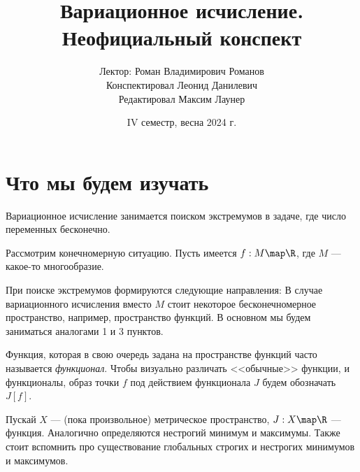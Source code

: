 \documentclass[a4paper]{article}
\date{IV семестр, весна 2024 г.}
\title{Вариационное исчисление. Неофициальный конспект}
\author{Лектор: Роман Владимирович Романов \\ Конспектировал Леонид Данилевич \\ Редактировал Максим Лаунер}
\begin{document}
    \maketitle
    \tableofcontents
    \newpage
    \setcounter{lection}{0}
    \section{Что мы будем изучать}
    Вариационное исчисление занимается поиском экстремумов в задаче, где число переменных бесконечно.

    Рассмотрим конечномерную ситуацию.
    Пусть имеется $f: M \map \R$, где $M$ --- какое-то многообразие.

    При поиске экстремумов формируются следующие направления:
    В случае вариационного исчисления вместо $M$ стоит некоторое бесконечномерное пространство, например, пространство функций.
    В основном мы будем заниматься аналогами 1 и 3 пунктов.

    Функция, которая в свою очередь задана на пространстве функций часто называется \emph{функционал}.
    Чтобы визуально различать <<обычные>> функции, и функционалы, образ точки $f$ под действием функционала $J$ будем обозначать $J[f]$.

    Пускай $X$ --- (пока произвольное) метрическое пространство, $J: X \map \R$ --- функция.
    Аналогично определяются нестрогий минимум и максимумы.
    Также стоит вспомнить про существование глобальных строгих и нестрогих минимумов и максимумов.
\end{document}
